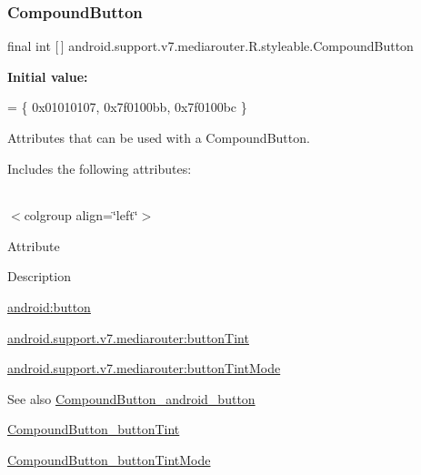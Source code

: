 \subsubsection{\texorpdfstring{Compound\+Button}{CompoundButton}}
{\footnotesize\ttfamily final int \mbox{[}$\,$\mbox{]} android.\+support.\+v7.\+mediarouter.\+R.\+styleable.\+Compound\+Button\hspace{0.3cm}{\ttfamily [static]}}

{\bfseries Initial value\+:}
\begin{DoxyCode}
= \{
            0x01010107, 0x7f0100bb, 0x7f0100bc
        \}
\end{DoxyCode}
Attributes that can be used with a Compound\+Button. 

Includes the following attributes\+:

\tabulinesep=1mm
\begin{longtabu} spread 0pt [c]{*{0}{|X[-1]}|}
\hline
\end{longtabu}
$<$colgroup align=\char`\"{}left\char`\"{}$>$ 

Attribute

Description 

{\ttfamily \hyperlink{classandroid_1_1support_1_1v7_1_1mediarouter_1_1R_1_1styleable_a0ed04398a990ae9c2c98f7a798a8dd8c}{android\+:button}}

{\ttfamily \hyperlink{classandroid_1_1support_1_1v7_1_1mediarouter_1_1R_1_1styleable_aeb077255316e6bd00655e23b070c34fc}{android.\+support.\+v7.\+mediarouter\+:button\+Tint}}

{\ttfamily \hyperlink{classandroid_1_1support_1_1v7_1_1mediarouter_1_1R_1_1styleable_aa96c6cd2513f203fc183a5d197e18721}{android.\+support.\+v7.\+mediarouter\+:button\+Tint\+Mode}}

\begin{DoxySeeAlso}{See also}
\hyperlink{classandroid_1_1support_1_1v7_1_1mediarouter_1_1R_1_1styleable_a0ed04398a990ae9c2c98f7a798a8dd8c}{Compound\+Button\+\_\+android\+\_\+button} 

\hyperlink{classandroid_1_1support_1_1v7_1_1mediarouter_1_1R_1_1styleable_aeb077255316e6bd00655e23b070c34fc}{Compound\+Button\+\_\+button\+Tint} 

\hyperlink{classandroid_1_1support_1_1v7_1_1mediarouter_1_1R_1_1styleable_aa96c6cd2513f203fc183a5d197e18721}{Compound\+Button\+\_\+button\+Tint\+Mode} 
\end{DoxySeeAlso}
\mbox{\label{classandroid_1_1support_1_1v7_1_1mediarouter_1_1R_1_1styleable_a0ed04398a990ae9c2c98f7a798a8dd8c}} 
